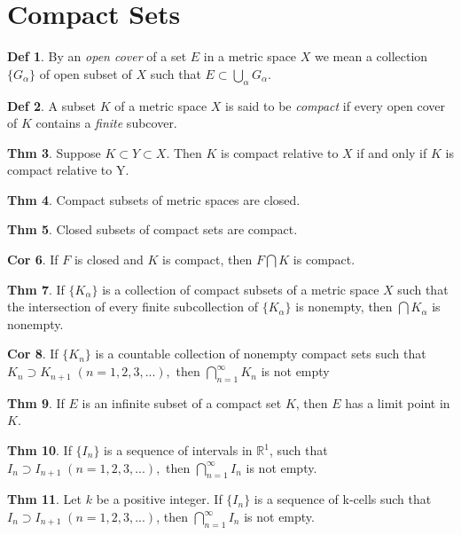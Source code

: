 \documentclass{article}
\theoremstyle{definition}
\newtheorem{definition}{Def}
\newtheorem{theorem}[definition]{Thm}
\newtheorem{corollary}[definition]{Cor}
\begin{document}
\section{Compact Sets}
\begin{definition}
    By an \textit{open cover} of a set $E$ in a metric space $X$ we mean a collection $\{G_\alpha\}$ of open subset of $X$ such that $E\subset \bigcup_\alpha G_\alpha$.
\end{definition}
\begin{definition}
    A subset $K$ of a metric space $X$ is said to be \textit{compact} if every open cover of $K$ contains a \textit{finite} subcover.
\end{definition}
\begin{theorem}
    Suppose $K\subset Y\subset X$. Then $K$ is compact relative to $X$ if and only if $K$ is compact relative to Y.
\end{theorem}
\begin{theorem}
    Compact subsets of metric spaces are closed.
\end{theorem}
\begin{theorem}
    Closed subsets of compact sets are compact.
\end{theorem}
\begin{corollary}
    If $F$ is closed and $K$ is compact, then $F\bigcap K$ is compact.
\end{corollary}
\begin{theorem}
    If $\{K_\alpha\}$ is a collection of compact subsets of a metric space $X$ such that the intersection of every finite subcollection of $\{K_\alpha\}$ is nonempty, then $\bigcap K_\alpha$ is nonempty.
\end{theorem}
\begin{corollary}
    If $\{K_n\}$ is a countable collection of nonempty compact sets such that $K_n\supset K_{n+1}\;(n=1,2,3,...),$ then $\bigcap_{n=1}^\infty K_n$ is not empty
\end{corollary}
\begin{theorem}
    If $E$ is an infinite subset of a compact set $K$, then $E$ has a limit point in $K$.
\end{theorem}
\begin{theorem}
    If $\{I_n\}$ is a sequence of intervals in $\mathbb{R}^1$, such that $I_n \supset I_{n+1}\;(n=1,2,3,... ),$ then $\bigcap_{n=1}^\infty I_n$ is not empty.
\end{theorem}
\begin{theorem}
    Let $k$ be a positive integer. If $\{I_n\}$ is a sequence of k-cells such that $I_n\supset I_{n+1}\;(n=1,2,3,...)$, then $\bigcap_{n=1}^\infty I_n$ is not empty.
\end{theorem}
\end{document}
